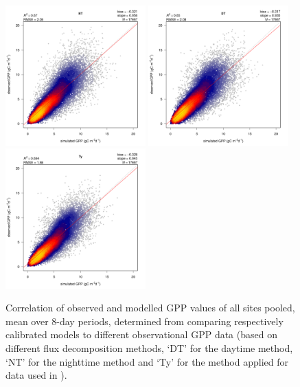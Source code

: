 \documentclass{myreport}
\begin{document}
\begin{figure}[!ht]
\includegraphics[width=0.48\textwidth]{fig/modobs_xdaily_NT.pdf}
\includegraphics[width=0.48\textwidth]{fig/modobs_xdaily_DT.pdf}\\
\includegraphics[width=0.48\textwidth]{fig/modobs_xdaily_Ty.pdf}
    \caption{Correlation of observed and modelled GPP values of all sites pooled, mean over 8-day periods, determined from comparing respectively calibrated models to different observational GPP data (based on different flux decomposition methods, `DT' for the daytime method, `NT' for the nighttime method and `Ty' for the method applied for data used in \cite{wang17rs}).}
    \label{fig:modobs_10d_gppdata}
\end{figure}
\end{document}
